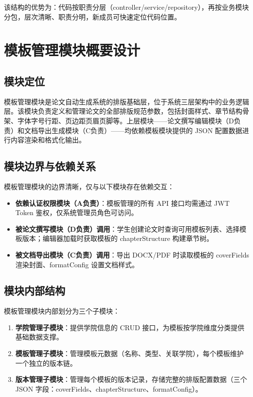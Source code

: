 \documentclass{../softeng}
\begin{document}
该结构的优势为：代码按职责分层（controller/service/repository），再按业务模块分包，层次清晰、职责分明，新成员可快速定位代码位置。

\section{模板管理模块概要设计}

\subsection{模块定位}

模板管理模块是论文自动生成系统的排版基础层，位于系统三层架构中的业务逻辑层。该模块负责定义和管理论文的全部排版规范参数，包括封面样式、章节结构骨架、字体字号行距、页边距页眉页脚等。上层模块——论文撰写编辑模块（D负责）和文档导出生成模块（C负责）——均依赖模板模块提供的 JSON 配置数据进行内容渲染和格式化输出。

\subsection{模块边界与依赖关系}

模板管理模块的边界清晰，仅与以下模块存在依赖交互：

\begin{itemize}
    \item \textbf{依赖认证权限模块（A负责）}：模板管理的所有 API 接口均需通过 JWT Token 鉴权，仅系统管理员角色可访问。
    \item \textbf{被论文撰写模块（D负责）调用}：学生创建论文时查询可用模板列表、选择模板版本；编辑器加载时获取模板的 chapterStructure 构建章节树。
    \item \textbf{被文档导出模块（C负责）调用}：导出 DOCX/PDF 时读取模板的 coverFields 渲染封面、formatConfig 设置文档样式。
\end{itemize}

\subsection{模块内部结构}

模板管理模块内部划分为三个子模块：

\begin{enumerate}
    \item \textbf{学院管理子模块}：提供学院信息的 CRUD 接口，为模板按学院维度分类提供基础数据支撑。
    \item \textbf{模板管理子模块}：管理模板元数据（名称、类型、关联学院），每个模板维护一个独立的版本链。
    \item \textbf{版本管理子模块}：管理每个模板的版本记录，存储完整的排版配置数据（三个 JSON 字段：coverFields、chapterStructure、formatConfig）。
\end{enumerate}
\end{document}
